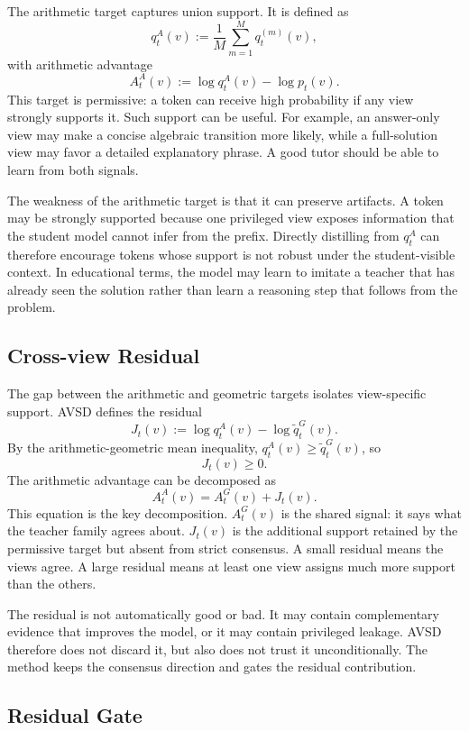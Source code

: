 The arithmetic target captures union support. It is defined as
\[
    q_t^A(v) := \frac{1}{M}\sum_{m=1}^{M}q_t^{(m)}(v),
\]
with arithmetic advantage
\[
    A_t^A(v) := \log q_t^A(v)-\log p_t(v).
\]
This target is permissive: a token can receive high probability if any view strongly supports it. Such support can be useful. For example, an answer-only view may make a concise algebraic transition more likely, while a full-solution view may favor a detailed explanatory phrase. A good tutor should be able to learn from both signals.

The weakness of the arithmetic target is that it can preserve artifacts. A token may be strongly supported because one privileged view exposes information that the student model cannot infer from the prefix. Directly distilling from $q_t^A$ can therefore encourage tokens whose support is not robust under the student-visible context. In educational terms, the model may learn to imitate a teacher that has already seen the solution rather than learn a reasoning step that follows from the problem.

\subsection{Cross-view Residual}

The gap between the arithmetic and geometric targets isolates view-specific support. AVSD defines the residual
\[
    J_t(v) := \log q_t^A(v)-\log \widetilde{q}_t^G(v).
\]
By the arithmetic-geometric mean inequality, $q_t^A(v)\geq \widetilde{q}_t^G(v)$, so
\[
    J_t(v)\geq 0.
\]
The arithmetic advantage can be decomposed as
\[
    A_t^A(v)=A_t^G(v)+J_t(v).
\]
This equation is the key decomposition. $A_t^G(v)$ is the shared signal: it says what the teacher family agrees about. $J_t(v)$ is the additional support retained by the permissive target but absent from strict consensus. A small residual means the views agree. A large residual means at least one view assigns much more support than the others.

The residual is not automatically good or bad. It may contain complementary evidence that improves the model, or it may contain privileged leakage. AVSD therefore does not discard it, but also does not trust it unconditionally. The method keeps the consensus direction and gates the residual contribution.

\subsection{Residual Gate}

